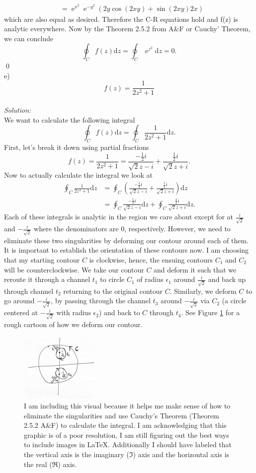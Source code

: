\documentclass[10pt]{amsart}
\newcommand{\D}{\mathrm{d}}
\DeclareMathOperator{\E}{e}
\theoremstyle{nonumberplain}
\begin{document}
\begin{enumerate}[label={\bf {\arabic*}:}]
\begin{align*}
	&= \E^{x^2} \E^{-y^2} \left(2y\cos (2xy) + \sin (2xy)2x \right)
\end{align*}
which are also equal as desired.
Therefore the C-R equations hold and f(z) is analytic everywhere.
Now by the Theorem 2.5.2 from A\&F or Cauchy' Theorem, we can conclude
$$
\oint_C f(z)\D z = \oint_C \E^{z^2} \D z = 0.
$$
\qed 
\\
e) $$f(z) = \frac{1}{2z^2 + 1} $$ \\
\textit{Solution:} \\
We want to calculate the following integral
$$
\oint_C f(z)\D z = \oint_C \frac{1}{2z^2 + 1} \D z.
$$
First, let's break it down using partial fractions
$$
f(z) = \frac{1}{2z^2 + 1} = \frac{-\frac1 2 i}{\sqrt{2}z - i} + \frac{\frac1 2 i}{\sqrt{2}z + i}.
$$
Now to actually calculate the integral we look at
\begin{align*}
\oint_C \frac{1}{2z^2 + 1} \D z &= \oint_C \left(\frac{-\frac1 2 i}{\sqrt{2}z - i} + \frac{\frac1 2 i}{\sqrt{2}z + i} \right)\D z \\
	&= \oint_C \frac{-\frac1 2 i}{\sqrt{2}z - i}\D z + \oint_C\frac{\frac1 2 i}{\sqrt{2}z + i} \D z.
\end{align*}
Each of these integrals is analytic in the region we care about except for at $\frac i {\sqrt{2}}$ and $-\frac i {\sqrt{2}}$ where the denominators are $0$, respectively.
However, we need to eliminate these two singularities by deforming our contour around each of them.
It is important to establish the orientation of these contours now. I am choosing that my starting contour $C$ is clockwise, hence, the ensuing contours $C_1$ and $C_2$ will be counterclockwise.
We take our contour $C$ and deform it such that we reroute it through a channel $t_1$ to circle $C_1$ of radius $\epsilon_1$ around $\frac i {\sqrt{2}} $ and back up through channel $t_2$ returning to the original contour $C$.
Similarly, we deform $C$ to go around $- \frac i {\sqrt{2}}$, by passing through the channel $t_3$ around $- \frac i {\sqrt{2}}$ via $C_2$ (a circle centered at $- \frac i {\sqrt{2}}$ with radius $\epsilon_2$) and back to $C$ through $t_4$. See Figure \ref{fig:f1} for a rough cartoon of how we deform our contour.
\\
\begin{figure}[h]
	\centering
	\includegraphics{problem5contour}
	\caption{
		I am including this visual because it helps me make sense of how to eliminate the singularities and use Cauchy's Theorem (Theorem 2.5.2 A\&F) to calculate the integral. I am acknowledging that this graphic is of a poor resolution, I am still figuring out the best ways to include images in \LaTeX. Additionally I should have labeled that the vertical axis is the imaginary ($\Im$) axis and the horizontal axis is the real ($\Re$) axis.
	}\label{fig:f1}
\end{figure}


\end{enumerate}
\end{document}
